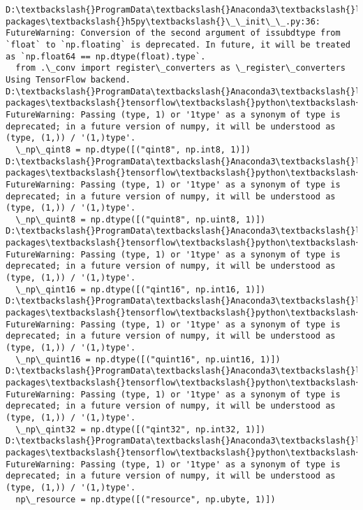 \documentclass[11pt]{article}
\begin{document}
    \begin{Verbatim}[commandchars=\\\{\}]
D:\textbackslash{}ProgramData\textbackslash{}Anaconda3\textbackslash{}lib\textbackslash{}site-packages\textbackslash{}h5py\textbackslash{}\_\_init\_\_.py:36: FutureWarning: Conversion of the second argument of issubdtype from `float` to `np.floating` is deprecated. In future, it will be treated as `np.float64 == np.dtype(float).type`.
  from .\_conv import register\_converters as \_register\_converters
Using TensorFlow backend.
D:\textbackslash{}ProgramData\textbackslash{}Anaconda3\textbackslash{}lib\textbackslash{}site-packages\textbackslash{}tensorflow\textbackslash{}python\textbackslash{}framework\textbackslash{}dtypes.py:526: FutureWarning: Passing (type, 1) or '1type' as a synonym of type is deprecated; in a future version of numpy, it will be understood as (type, (1,)) / '(1,)type'.
  \_np\_qint8 = np.dtype([("qint8", np.int8, 1)])
D:\textbackslash{}ProgramData\textbackslash{}Anaconda3\textbackslash{}lib\textbackslash{}site-packages\textbackslash{}tensorflow\textbackslash{}python\textbackslash{}framework\textbackslash{}dtypes.py:527: FutureWarning: Passing (type, 1) or '1type' as a synonym of type is deprecated; in a future version of numpy, it will be understood as (type, (1,)) / '(1,)type'.
  \_np\_quint8 = np.dtype([("quint8", np.uint8, 1)])
D:\textbackslash{}ProgramData\textbackslash{}Anaconda3\textbackslash{}lib\textbackslash{}site-packages\textbackslash{}tensorflow\textbackslash{}python\textbackslash{}framework\textbackslash{}dtypes.py:528: FutureWarning: Passing (type, 1) or '1type' as a synonym of type is deprecated; in a future version of numpy, it will be understood as (type, (1,)) / '(1,)type'.
  \_np\_qint16 = np.dtype([("qint16", np.int16, 1)])
D:\textbackslash{}ProgramData\textbackslash{}Anaconda3\textbackslash{}lib\textbackslash{}site-packages\textbackslash{}tensorflow\textbackslash{}python\textbackslash{}framework\textbackslash{}dtypes.py:529: FutureWarning: Passing (type, 1) or '1type' as a synonym of type is deprecated; in a future version of numpy, it will be understood as (type, (1,)) / '(1,)type'.
  \_np\_quint16 = np.dtype([("quint16", np.uint16, 1)])
D:\textbackslash{}ProgramData\textbackslash{}Anaconda3\textbackslash{}lib\textbackslash{}site-packages\textbackslash{}tensorflow\textbackslash{}python\textbackslash{}framework\textbackslash{}dtypes.py:530: FutureWarning: Passing (type, 1) or '1type' as a synonym of type is deprecated; in a future version of numpy, it will be understood as (type, (1,)) / '(1,)type'.
  \_np\_qint32 = np.dtype([("qint32", np.int32, 1)])
D:\textbackslash{}ProgramData\textbackslash{}Anaconda3\textbackslash{}lib\textbackslash{}site-packages\textbackslash{}tensorflow\textbackslash{}python\textbackslash{}framework\textbackslash{}dtypes.py:535: FutureWarning: Passing (type, 1) or '1type' as a synonym of type is deprecated; in a future version of numpy, it will be understood as (type, (1,)) / '(1,)type'.
  np\_resource = np.dtype([("resource", np.ubyte, 1)])

    \end{Verbatim}
\end{document}
